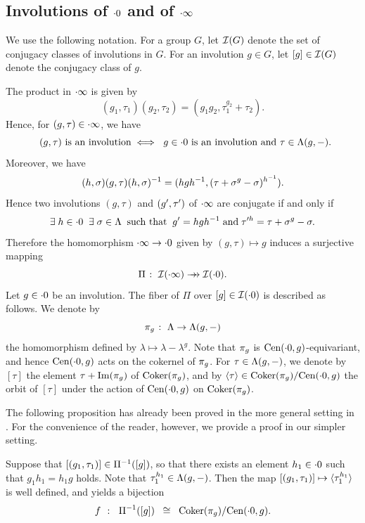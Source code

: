 \documentclass{amsart} %
\begin{document}
\subsection{Involutions of $\cdot 0$ and of $\cdot \infty$}\label{subsec:zinf}
%
We use the following notation.
For a group $G$, let $\mathord{\mathcal{I}}(G)$ denote the set of conjugacy classes of involutions in $G$.
For an involution $g\in G$, let $[g]\in \mathord{\mathcal{I}}(G)$ denote the conjugacy class of $g$.
\par
The product in $\cdot \infty$ is given by 
\[
(g_1, \tau_1)(g_2, \tau_2)=(g_1g_2, \tau_1^{g_2}+\tau_2).
\]
Hence, for $(g, \tau)\in \cdot \infty$, we have 
%
\begin{equation}\label{eq:gtauisinvoliff}
\textrm{\;\;$(g, \tau)$ is an involution}
\;\Longleftrightarrow\;
\textrm{
$g\in \cdot 0$ is an involution and $\tau\in \Lambda(g, -)$}.
\end{equation}
%
Moreover, we have 
%
\begin{equation}\label{eq:hsgthsinv}
(h, \sigma)(g, \tau)(h, \sigma)^{-1}
=(hgh^{-1}, (\tau+\sigma^g-\sigma)^{h^{-1}}).
\end{equation}
%
Hence 
two involutions $(g, \tau)$ and $(g^{\prime}, \tau^{\prime})$ of $\cdot \infty$ are conjugate if and only if
%
\begin{equation}\label{eq:conjiff}
\exists\; h\in \cdot 0 \;\;
\exists\; \sigma\in \Lambda \;\;
\textrm{such that} \;\;
g^{\prime}=h g h^{-1}
\;\textrm{and}\; \tau\sp{\prime h}=\tau+\sigma^{g}-\sigma.
\end{equation}
%
Therefore the homomorphism $\cdot \infty \to \cdot 0$ given by $(g, \tau)\mapsto g$
induces a surjective mapping
\[
\Pi\;\colon\; \mathord{\mathcal{I}}(\cdot \infty)\mathrel{\rightarrow\!\!\!\!\rightarrow} \mathord{\mathcal{I}}(\cdot 0).
\]
Let $g\in \cdot 0$ be an involution.
The fiber of $\Pi$ over $[g]\in\mathord{\mathcal{I}}(\cdot 0)$ is described as follows.
We denote by 
\[
\pi_{g}\;\colon\; \Lambda \to \Lambda (g, -)
\]
the homomorphism defined by $\lambda\mapsto \lambda-\lambda^g$.
Note that $\pi_{g}$ is $\mathrm{Cen}(\cdot 0, g)$-equivariant,
and hence $\mathrm{Cen}(\cdot 0, g)$ acts on the cokernel of $\pi_{g}$.
For $\tau\in \Lambda (g, -)$, 
we denote by $[\tau]$ the element $\tau+\operatorname{Im}(\pi_{g})$ of $\operatorname{Coker}(\pi_{g})$,
and by $\langle {\tau} \rangle\in \operatorname{Coker}(\pi_{g})/\mathrm{Cen}(\cdot 0, g)$ the orbit of
$[\tau]$ under the action of $\mathrm{Cen}(\cdot 0, g)$ on $ \operatorname{Coker}(\pi_{g})$.
%
\par
The following proposition has already been proved in the more general setting in \cite[Lemma 4.13]{MR4931809}. 
For the convenience of the reader, however, we provide a proof in our simpler setting.
%
\begin{proposition}\label{prop:bijf}
Suppose that $[(g_1, \tau_1)]\in \Pi^{-1}([g])$,
so that there exists an element $h_1\in \cdot 0$
such that $g_1h_1=h_1 g $ holds.
Note that $\tau_1\sp{h_1}\in \Lambda(g, -)$.
Then the map
$[(g_1, \tau_1)] \mapsto \langle {\tau_1\sp{h_1}} \rangle$ 
is well defined, and 
yields a bijection 
%
\begin{equation}\label{eq:Piinvg}
f\;\;\colon\;\; \Pi^{-1}([g])\;\;\cong\;\; \operatorname{Coker}(\pi_{g})/\mathrm{Cen}(\cdot 0, g).
\end{equation}
%
\end{proposition}
\end{document}

